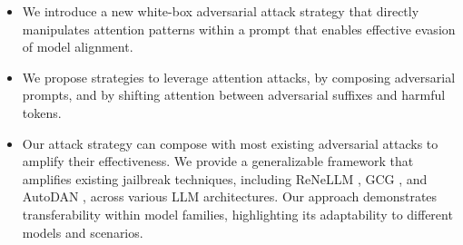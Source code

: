 \begin{itemize}[topsep=1pt, partopsep=1pt, parsep=1pt, itemsep=1pt]

\item We introduce a new white-box adversarial attack strategy that directly manipulates attention patterns within a prompt that enables effective evasion of model alignment.

\item We propose strategies to leverage attention attacks, by composing adversarial prompts, and by shifting attention between adversarial suffixes and harmful tokens. 

\item  Our attack strategy can compose with most existing adversarial attacks to amplify their effectiveness.  We provide a generalizable framework that amplifies existing jailbreak techniques, including ReNeLLM \cite{ding2023wolf}, GCG \cite{zou2023universal}, and AutoDAN \cite{liu2023autodan}, across various LLM architectures. Our approach demonstrates transferability within model families, highlighting its adaptability to different models and scenarios.




\end{itemize}




























 



















